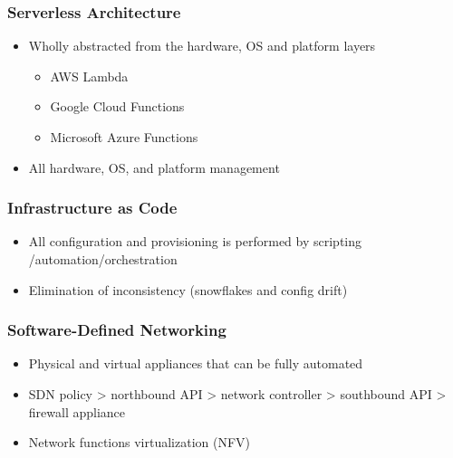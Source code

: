 		\subsubsection {Serverless Architecture}
			\begin{itemize}
				\item Wholly abstracted from the hardware, OS and platform layers
					\begin{itemize}
						\item AWS Lambda
						\item Google Cloud Functions
						\item Microsoft Azure Functions
					\end{itemize}
				\item All hardware, OS, and platform management
			\end{itemize}
		\subsubsection {Infrastructure as Code}
			\begin{itemize}
				\item All configuration and provisioning is performed by scripting
					/automation/orchestration
				\item Elimination of inconsistency (snowflakes and config drift)
			\end{itemize}
		\subsubsection {Software-Defined Networking}
			\begin{itemize}
				\item Physical and virtual appliances that can be fully automated
				\item SDN policy > northbound API > network controller > southbound API
					> firewall appliance
				\item Network functions virtualization (NFV)
			\end{itemize}
